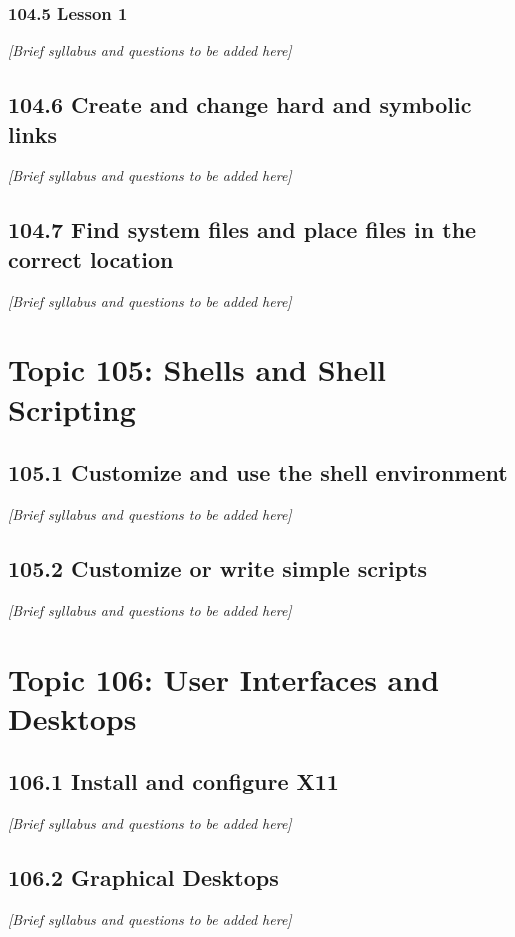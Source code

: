 \documentclass[12pt,a4paper]{report}
\begin{document}
\subsection*{104.5 Lesson 1}
\textit{[Brief syllabus and questions to be added here]}

\section{104.6 Create and change hard and symbolic links}
\textit{[Brief syllabus and questions to be added here]}

\section{104.7 Find system files and place files in the correct location}
\textit{[Brief syllabus and questions to be added here]}

\chapter{Topic 105: Shells and Shell Scripting}
\section{105.1 Customize and use the shell environment}
\textit{[Brief syllabus and questions to be added here]}

\section{105.2 Customize or write simple scripts}
\textit{[Brief syllabus and questions to be added here]}

\chapter{Topic 106: User Interfaces and Desktops}
\section{106.1 Install and configure X11}
\textit{[Brief syllabus and questions to be added here]}

\section{106.2 Graphical Desktops}
\textit{[Brief syllabus and questions to be added here]}
\end{document}

